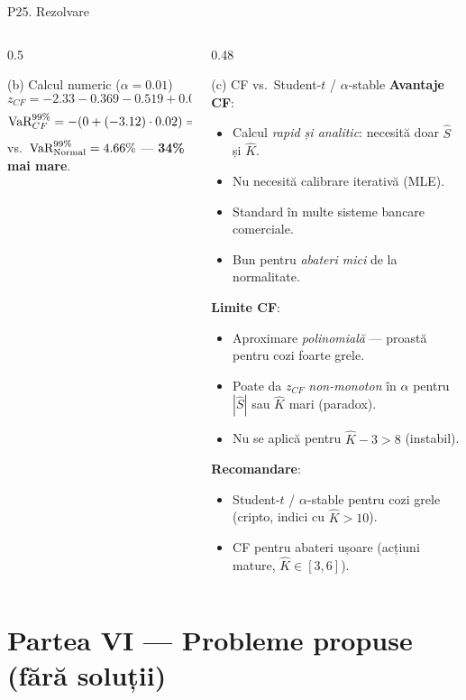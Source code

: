 \documentclass[9pt, aspectratio=169, t]{beamer}
\begin{document}
\begin{frame}[shrink=40]{P25. Rezolvare}
\begin{columns}[T]
\begin{column}{0.5\textwidth}
\begin{block}{(b) Calcul numeric ($\alpha=0.01$)}
\[
z_{CF} = -2.33 - 0.369 - 0.519 + 0.0948 = -3.12
\]
\[
\text{VaR}_{CF}^{99\%} = -(0 + (-3.12)\cdot 0.02) = \mathbf{0.0624 = 6.24\%}
\]
vs.\ $\text{VaR}^{99\%}_{\text{Normal}} = 4.66\%$ --- \textbf{34\% mai mare}.
\end{block}
\end{column}
\begin{column}{0.48\textwidth}
\begin{block}{(c) CF vs.\ Student-$t$ / $\alpha$-stable}
\textbf{Avantaje CF}:
\begin{itemize}\setlength{\itemsep}{0pt}
    \item Calcul \emph{rapid și analitic}: necesită doar $\hat S$ și $\hat K$.
    \item Nu necesită calibrare iterativă (MLE).
    \item Standard în multe sisteme bancare comerciale.
    \item Bun pentru \emph{abateri mici} de la normalitate.
\end{itemize}
\textbf{Limite CF}:
\begin{itemize}\setlength{\itemsep}{0pt}
    \item Aproximare \emph{polinomială} --- proastă pentru cozi foarte grele.
    \item Poate da $z_{CF}$ \emph{non-monoton} în $\alpha$ pentru $|\hat S|$ sau $\hat K$ mari (paradox).
    \item Nu se aplică pentru $\hat K - 3 > 8$ (instabil).
\end{itemize}
\textbf{Recomandare}:
\begin{itemize}\setlength{\itemsep}{0pt}
    \item Student-$t$ / $\alpha$-stable pentru cozi grele (cripto, indici cu $\hat K > 10$).
    \item CF pentru abateri ușoare (acțiuni mature, $\hat K \in [3, 6]$).
\end{itemize}
\end{block}
\end{column}
\end{columns}
\end{frame}

\section{Partea VI --- Probleme propuse (fără soluții)}
\end{document}
